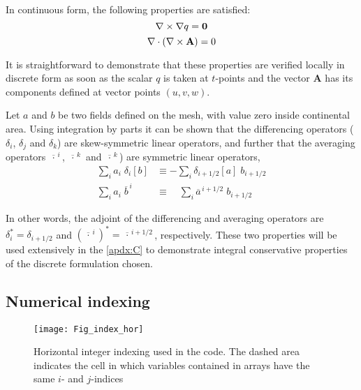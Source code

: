 \documentclass[../main/NEMO_manual]{subfiles}
\begin{document}
In continuous form, the following properties are satisfied:
\begin{equation}
  \label{eq:DOM_curl_grad}
  \nabla \times \nabla q ={\rm {\bf {0}}}
\end{equation}
\begin{equation}
  \label{eq:DOM_div_curl}
  \nabla \cdot \left( {\nabla \times {\rm {\bf A}}} \right)=0
\end{equation}

It is straightforward to demonstrate that these properties are verified locally in discrete form as soon as
the scalar $q$ is taken at $t$-points and
the vector \textbf{A} has its components defined at vector points $(u,v,w)$.

Let $a$ and $b$ be two fields defined on the mesh, with value zero inside continental area.
Using integration by parts it can be shown that
the differencing operators ($\delta_i$, $\delta_j$ and $\delta_k$) are skew-symmetric linear operators,
and further that the averaging operators $\overline{\,\cdot\,}^{\,i}$, $\overline{\,\cdot\,}^{\,k}$ and
$\overline{\,\cdot\,}^{\,k}$) are symmetric linear operators, \ie
\begin{align}
  \label{eq:DOM_di_adj}
  \sum\limits_i { a_i \;\delta_i \left[ b \right]}
  &\equiv -\sum\limits_i {\delta_{i+1/2} \left[ a \right]\;b_{i+1/2} }      \\
  \label{eq:DOM_mi_adj}
  \sum\limits_i { a_i \;\overline b^{\,i}}
  & \equiv \quad \sum\limits_i {\overline a ^{\,i+1/2}\;b_{i+1/2} }
\end{align}

In other words, the adjoint of the differencing and averaging operators are $\delta_i^*=\delta_{i+1/2}$ and 
${(\overline{\,\cdot \,}^{\,i})}^*= \overline{\,\cdot\,}^{\,i+1/2}$, respectively. 
These two properties will be used extensively in the \autoref{apdx:C} to
demonstrate integral conservative properties of the discrete formulation chosen.

\subsection{Numerical indexing}
\label{subsec:DOM_Num_Index}

\begin{figure}[!tb]
  \begin{center}
    \texttt{[image: Fig\_index\_hor]}
    \caption{
      \protect\label{fig:index_hor}
      Horizontal integer indexing used in the \fortran code.
      The dashed area indicates the cell in which variables contained in arrays have the same $i$- and $j$-indices
    }
  \end{center}
\end{figure}
\end{document}
